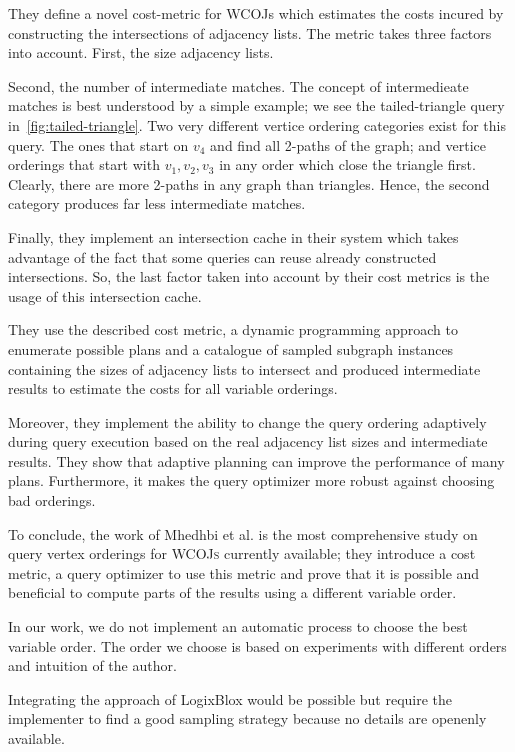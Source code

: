 They define a novel cost-metric for \textsc{WCOJ}s which estimates the costs incured by constructing the intersections of adjacency
lists.
The metric takes three factors into account.
First, the size adjacency lists.

Second, the number of intermediate matches.
The concept of intermedieate matches is best understood by a simple example;
we see the tailed-triangle query in~\cref{fig:tailed-triangle}.
Two very different vertice ordering categories exist for this query.
The ones that start on $v_4$ and find all 2-paths of the graph;
and vertice orderings that start with $v_1, v_2, v_3$ in any order which close the triangle first.
Clearly, there are more 2-paths in any graph than triangles.
Hence, the second category produces far less intermediate matches.

Finally, they implement an intersection cache in their system which takes advantage of the fact that some queries can reuse already
constructed intersections.
So, the last factor taken into account by their cost metrics is the usage of this intersection cache.

They use the described cost metric, a dynamic programming approach to enumerate possible plans and  a catalogue of sampled subgraph
instances containing the sizes of adjacency lists to intersect and produced intermediate results to estimate the costs for all
variable orderings.

Moreover, they implement the ability to change the query ordering adaptively during query execution  based on the real adjacency list sizes
and intermediate results.
They show that adaptive planning can improve the performance of many plans.
Furthermore, it makes the query optimizer more robust against choosing bad orderings.

To conclude, the work of Mhedhbi et al. is the most comprehensive study on query vertex orderings for \textsc{WCOJs} currently available;
they introduce a cost metric, a query optimizer to use this metric and prove that it is possible and beneficial to compute parts of
the results using a different variable order.

In our work, we do not implement an automatic process to choose the best variable order.
The order we choose is based on experiments with different orders and intuition of the author.

Integrating the approach of LogixBlox would be possible but require the implementer to find a good sampling strategy because no details
are openenly available.

